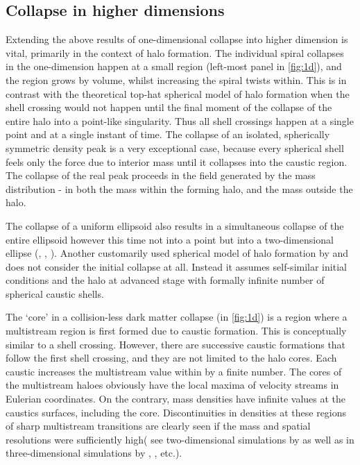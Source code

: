 \documentclass[fleqn,usenatbib,useAMS]{mnras}
\begin{document}
\subsection{Collapse in higher dimensions}

Extending the above results of one-dimensional collapse into higher dimension is vital, primarily in the context of halo formation. The individual spiral collapses in the one-dimension happen at a small region (left-most panel in \autoref{fig:1d}), and the region grows by volume, whilst increasing the spiral twists within. This is in contrast with the theoretical top-hat spherical model of halo formation when the shell crossing would not happen until the final moment of the collapse of the entire halo into a point-like singularity. Thus all shell crossings happen at a single point
and at a single instant of time. The collapse of an isolated, spherically symmetric density peak is a very exceptional case, because every spherical shell feels only the force due to interior mass until it collapses into the caustic region. The collapse of the real peak proceeds in the field generated by the mass distribution - in both the mass within the forming halo, and the mass outside the halo. 

The collapse of a uniform ellipsoid also results in a simultaneous collapse of the entire ellipsoid
however this time not into a point but into a two-dimensional ellipse (\citealt{Lin1965}, \citealt{Icke1975}, \citealt{Eisenstein1995}).
Another customarily used spherical model of halo formation by \cite{Fillmore1984} and \cite{Bertschinger1985} does not consider
the initial collapse at all. Instead it assumes self-similar initial conditions and the halo at advanced stage with formally infinite number of spherical caustic shells.

The `core' in a collision-less dark matter collapse (in \autoref{fig:1d}) is a region where a multistream region is first formed due to caustic formation. This is conceptually similar to a shell crossing. However, there are successive caustic formations that follow the first shell crossing, and they are not limited to the halo cores. Each caustic increases the multistream value within by a finite number. The cores of the multistream haloes obviously have the local maxima of velocity streams in Eulerian coordinates. On the contrary, mass densities have infinite values at the caustics surfaces, including the core. Discontinuities in densities at these regions of sharp multistream transitions are clearly seen if the mass and spatial resolutions were sufficiently high( see two-dimensional simulations by \citealt{Melott1989} as well as in three-dimensional simulations by \citealt{Hahn2013}, \citealt{Angulo2016}, \citealt{Hahn2016a} etc.). 
\end{document}
